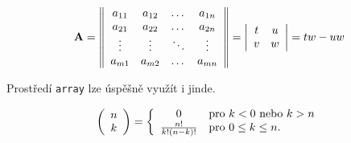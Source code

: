 \documentclass[a4paper, twocolumn, 10pt]{article}
\begin{document}
\begin{equation}\nonumber
\mbox{\textbf{A}} =
\left\| \begin{array}{cccc}
    a_{11} &  a_{12} & \dots & a_{1n}\\
    a_{21} &  a_{22} & \dots & a_{2n}\\ 
    \vdots &  \vdots & \ddots & \vdots\\
    a_{m1} &  a_{m2} & \dots & a_{mn}\\
\end{array}\right\|
=
\left| \begin{array}{cccc}
    t &  u \\
    v &  w 
\end{array}\right|
=
tw - uw
\end{equation}

Prostředí \texttt{array} lze úspěšně využít i jinde.

\begin{equation}\nonumber
\left(\begin{array}{c}
    n \\
    k 
\end{array}\right)
= \left\{
\begin{array}{c l}
0 & \text{pro } k < 0 \text{ nebo } k > n\\
\frac{n!}{k!(n - k)!} & \text{pro } 0\leq k\leq n.
\end{array} \right.
\end{equation}
\end{document}
